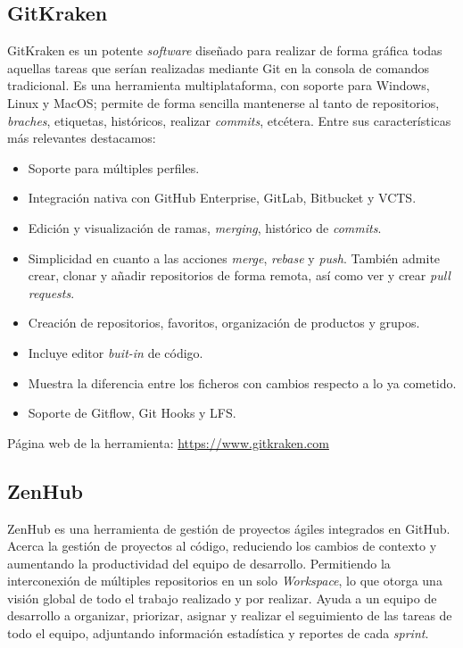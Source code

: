 \subsection{GitKraken}
GitKraken es un potente \textit{software} diseñado para realizar de forma gráfica todas aquellas tareas que serían realizadas mediante Git en la consola de comandos tradicional. Es una herramienta multiplataforma, con soporte para Windows, Linux y MacOS; permite de forma sencilla mantenerse al tanto de repositorios, \textit{braches}, etiquetas, históricos, realizar \textit{commits}, etcétera. Entre sus características más relevantes destacamos:
\begin{itemize}
\tightlist
\item Soporte para múltiples perfiles.
\item Integración nativa con GitHub Enterprise, GitLab, Bitbucket y VCTS.
\item Edición y visualización de ramas, \textit{merging}, histórico de \textit{commits}.
\item Simplicidad en cuanto a las acciones \textit{merge}, \textit{rebase} y \textit{push}. También admite crear, clonar y añadir repositorios de forma remota, así como ver y crear \textit{pull requests}.
\item Creación de repositorios, favoritos, organización de productos y grupos.
\item Incluye editor \textit{buit-in} de código. 
\item Muestra la diferencia entre los ficheros con cambios respecto a lo ya cometido.
\item Soporte de Gitflow, Git Hooks y LFS.
\end{itemize}

Página web de la herramienta: \url{https://www.gitkraken.com}

\subsection{ZenHub}
ZenHub es una herramienta de gestión de proyectos ágiles integrados en GitHub. Acerca la gestión de proyectos al código, reduciendo los cambios de contexto y aumentando la productividad del equipo de desarrollo. Permitiendo la interconexión de múltiples repositorios en un solo \textit{Workspace}, lo que otorga una visión global de todo el trabajo realizado y por realizar. Ayuda a un equipo de desarrollo a organizar, priorizar, asignar y realizar el seguimiento de las tareas de todo el equipo, adjuntando información estadística y reportes de cada \textit{sprint}.

